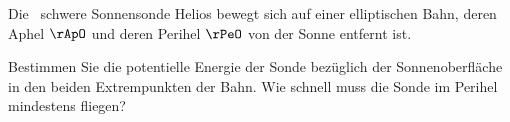 Die \mHeO\ schwere Sonnensonde Helios bewegt sich auf einer elliptischen Bahn, deren Aphel $\rApO$ und deren Perihel $\rPeO$ von der Sonne entfernt ist.

\begin{abcliste}
\abc Bestimmen Sie die potentielle Energie der Sonde bezüglich der Sonnenoberfläche in den beiden Extrempunkten der Bahn.
\abc Wie schnell muss die Sonde im Perihel mindestens fliegen?
\end{abcliste}
